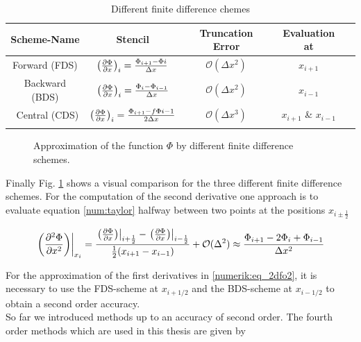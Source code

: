 \bgroup\large
\begin{table}[!bp]
\centering
\def\arraystretch{1.5}%
\begin{tabular}{c c c c c}\toprule
Scheme-Name & Stencil & Truncation Error & Evaluation at\\[0.5ex]
\midrule
Forward  (FDS) & $\left(\pdn[\Phi]{x}\right)_i =  \frac{\Phi_{i+1} - \Phi{i}}   {\Delta x}$ & $\mathcal{O}(\Delta x^2)$  &$x_{i+1}$\\
Backward (BDS) & $\left(\pdn[\Phi]{x}\right)_i = \frac{\Phi_{i}    - \Phi_{i-1}}{\Delta x}$  &$ \mathcal{O}(\Delta x^2)$ & $x_{i-1}$\\\
Central  (CDS) & $\left(\pdn[\Phi]{x}\right)_i = \frac{\Phi_{i+1}  - f\Phi{i-1}}{2\Delta x}$ &$ \mathcal{O}(\Delta x^3)$& $x_{i+1}$ \& $x_{i-1}$\\
\\
\bottomrule
\end{tabular}
\caption{Different finite difference chemes}
\label{num:df_table}
\end{table}
\egroup

\clearpage

\begin{figure}[!btp]
  \centering
  \caption{Approximation of the function $\Phi$ by different finite difference schemes.}
  \label{num:fd_image}
\end{figure}

Finally Fig. \ref{num:fd_image} shows a visual comparison for the three different finite difference schemes.
For the computation of the second derivative one approach is to evaluate equation \ref{num:taylor} halfway between two points at the positions $x_{i\pm\frac{1}{2}}$

\begin{align}
    \label{numerik:eq_2dfo2}
    \left.\left(\pdn[^2\Phi]{x^2}\right)\right|_{x_i} =
     \frac{\left.\left(\pdn[\Phi]{x}\right)\right|_{i+\frac{1}{2}}-
     \left.\left(\pdn[\Phi]{x}\right)\right|_{i-\frac{1}{2}}}
    {\frac{1}{2}(x_{i+1} - x_{i-1})} + \mathcal{O}(\Delta ^2)  \approx
    \frac{\Phi_{i+1} - 2\Phi_i + \Phi_{i-1}}{\Delta x^2}
\end{align}

For the approximation of the first derivatives in \ref{numerik:eq_2dfo2},
it is necessary to use the FDS-scheme at $x_{i+1/2}$ and the BDS-scheme at $x_{i-1/2}$ to obtain
a second order accuracy.\\
So far we introduced methods up to an accuracy of second order. The fourth order methods which are used in this thesis are given by

